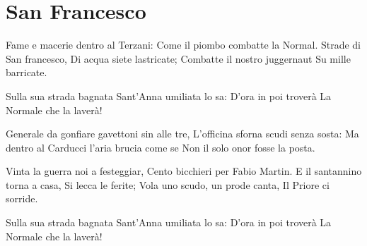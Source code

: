 \section{San Francesco}
\subtitle{Sulla melodia di “Stalingrado” degli Stormy Six}
\begin{canzone}
Fame e macerie dentro al Terzani:
Come il piombo combatte la Normal.
Strade di San francesco, 
Di acqua siete lastricate;
Combatte il nostro juggernaut 
Su mille barricate.

Sulla sua strada bagnata
Sant’Anna umiliata lo sa:
D’ora in poi troverà
La Normale che la laverà!

Generale da gonfiare gavettoni sin alle tre,
L’officina sforna scudi senza sosta:
Ma dentro al Carducci l’aria brucia come se
Non il solo onor fosse la posta.

Vinta la guerra noi a festeggiar,
Cento bicchieri per Fabio Martin.
E il santannino torna a casa,
Si lecca le ferite;
Vola uno scudo, un prode canta,
Il Priore ci sorride.

Sulla sua strada bagnata
Sant’Anna umiliata lo sa:
D’ora in poi troverà
La Normale che la laverà!
\end{canzone}
